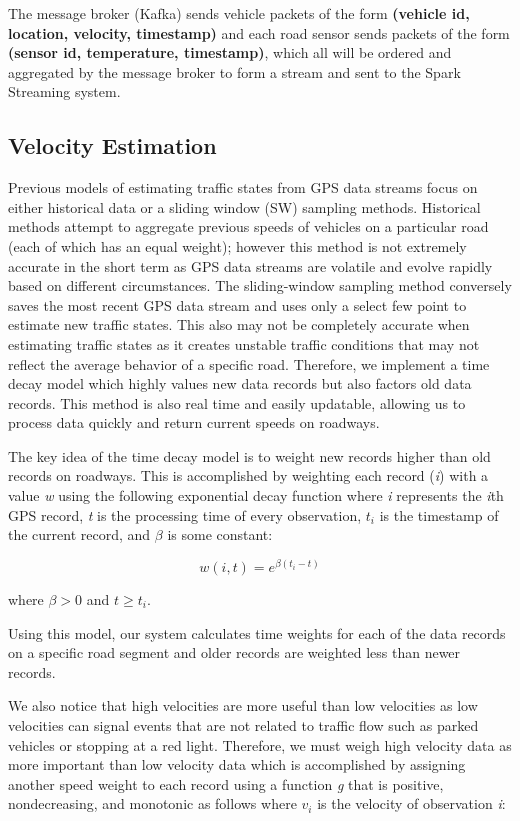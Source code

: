 \documentclass{vldb}
\begin{document}
The message broker (Kafka) sends vehicle packets of the form \textbf{(vehicle id, location, velocity, timestamp)} and each road sensor sends packets of the form \textbf{(sensor id, temperature, timestamp)}, which all will be ordered and aggregated by the message broker to form a stream and sent to the Spark Streaming system. 

\subsection{Velocity Estimation}
Previous models of estimating traffic states from GPS data streams focus on either historical data or a sliding window (SW) sampling methods. Historical methods attempt to aggregate previous speeds of vehicles on a particular road (each of which has an equal weight); however this method is not extremely accurate in the short term as GPS data streams are volatile and evolve rapidly based on different circumstances. The sliding-window sampling method conversely saves the most recent GPS data stream and uses only a select few point to estimate new traffic states. This also may not be completely accurate when estimating traffic states as it creates unstable traffic conditions that may not reflect the average behavior of a specific road. Therefore, we implement a time decay model which highly values new data records but also factors old data records. This method is also real time and easily updatable, allowing us to process data quickly and return current speeds on roadways. 

The key idea of the time decay model is to weight new records higher than old records on roadways. This is accomplished by weighting each record (\textit{i}) with a value \textit{w} using the following exponential decay function where \textit{i} represents the \textit{i}th GPS record, \textit{t} is the processing time of every observation, $t_i$ is the timestamp of the current record, and $\beta$ is some constant:

\begin{equation}w(i,t)=e^{\beta(t_i-t)}\end{equation}

where $\beta > 0$ and $t \geq t_i$.

Using this model, our system calculates time weights for each of the data records on a specific road segment and older records are weighted less than newer records. 

We also notice that high velocities are more useful than low velocities as low velocities can signal events that are not related to traffic flow such as parked vehicles or stopping at a red light. Therefore, we must weigh high velocity data as more important than low velocity data which is accomplished by assigning another speed weight to each record using a function \textit{g} that is positive, nondecreasing, and monotonic as follows where $v_i$ is the velocity of observation \textit{i}:
\end{document}
